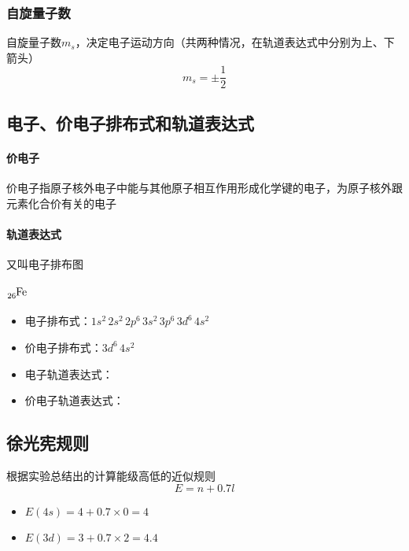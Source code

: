 \documentclass[a4paper]{article}
\begin{document}
	\subsubsection{自旋量子数}
	自旋量子数$m_s$，决定电子运动方向（共两种情况，在轨道表达式中分别为上、下箭头）
	$$m_s=\pm\frac12$$
	
	
	\subsection{电子、价电子排布式和轨道表达式}
	\paragraph{价电子}
	价电子指原子核外电子中能与其他原子相互作用形成化学键的电子，为原子核外跟元素化合价有关的电子
	\paragraph{轨道表达式}
	又叫电子排布图
	\paragraph{$\ce{_{26}Fe}$}
	\begin{itemize}
		\item 电子排布式：$1s^2\,2s^2\,2p^6\,3s^2\,3p^6\,3d^6\,4s^2$
		\item 价电子排布式：$3d^6\,4s^2$
		\item 电子轨道表达式：\fbox{$\uparrow\downarrow$}\quad\fbox{$\uparrow\downarrow$}\quad\fbox{$\uparrow\downarrow$}\fbox{$\uparrow\downarrow$}\fbox{$\uparrow\downarrow$}\quad\fbox{$\uparrow\downarrow$}\quad\fbox{$\uparrow\downarrow$}\fbox{$\uparrow\downarrow$}\fbox{$\uparrow\downarrow$}\quad\fbox{$\uparrow\downarrow$}\fbox{$\uparrow\ $}\fbox{$\uparrow\ $}\fbox{$\uparrow\ $}\fbox{$\uparrow\ $}\quad\fbox{$\uparrow\downarrow$}
		\item 价电子轨道表达式：\fbox{$\uparrow\downarrow$}\fbox{$\uparrow\ $}\fbox{$\uparrow\ $}\fbox{$\uparrow\ $}\fbox{$\uparrow\ $}\quad\fbox{$\uparrow\downarrow$}
	\end{itemize}
	
	

	\subsection{徐光宪规则}
	根据实验总结出的计算能级高低的近似规则
	$$E=n+0.7l$$
	\begin{itemize}
		\item $E(4s)=4+0.7\times 0=4$
		\item $E(3d)=3+0.7\times 2=4.4$
	\end{itemize}
\end{document}
